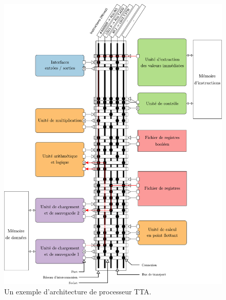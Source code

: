 \begin{figure}[htp]
\centering
\includegraphics[width=\textwidth]{main/ch4_fig/archi_tta}
\caption{Un exemple d'architecture de processeur TTA. }
\end{figure}

